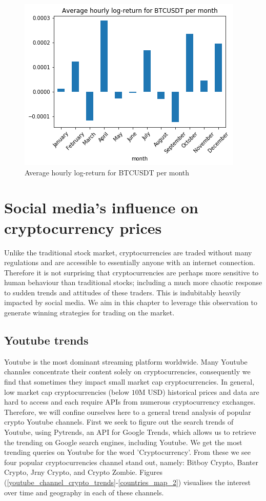 \documentclass[twoside]{report}
\begin{document}
\begin{spacing}{1}
\begin{figure}[!htbp]
    \centering
    \includegraphics[width=0.7\linewidth]{Images/Average hourly log-return for BTCUSDT per month.png}
    \caption{Average hourly log-return for BTCUSDT per month}
    \label{Average hourly log-return for BTCUSDT per month}
\end{figure}








\chapter{Social media's influence on cryptocurrency prices}

Unlike the traditional stock market, cryptocurrencies are traded without many regulations and are accessible to essentially anyone with an internet connection. Therefore it is not surprising that cryptocurrencies are perhaps more sensitive to human behaviour than traditional stocks; including a much more chaotic response to sudden trends and attitudes of these traders. This is indubitably heavily impacted by social media. We aim in this chapter to leverage this observation to generate winning strategies for trading on the market. 

\section{Youtube trends}

Youtube is the most dominant streaming platform worldwide. Many Youtube channles concentrate their content solely on cryptocurrencies, consequently we find that sometimes they impact small market cap cryptocurrencies. In general, low market cap cryptocurrencies (below $10
$M USD) historical prices and data are hard to access and each require APIs from numerous cryptocurrency exchanges. Therefore, we will confine ourselves here to a general trend analysis of popular crypto Youtube channels.
First we seek to figure out the search trends of Youtube, using Pytrends, an API for Google Trends, which allows us to retrieve the trending on Google search engines, including Youtube. We get the most trending queries on Youtube for the word 'Cryptocurrency'. From these we see four popular cryptocurrencies channel stand out, namely: Bitboy Crypto, Banter Crypto, Jrny Crypto, and Crypto Zombie. Figures (\ref{youtube_channel_crypto_trends}-\ref{countries_map_2}) visualises the interest over time and geography in each of these channels.


\end{spacing}
\end{document}
